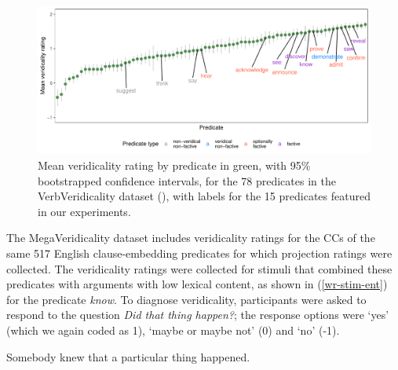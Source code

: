 \documentclass[11pt,fleqn]{article}
\newcommand{\6}{\mbox{$[\hspace*{-.6mm}[$}}
\newcommand{\9}{\mbox{$]\hspace*{-.6mm}]$}}
\begin{document}
\begin{figure}[H]
\centering
\includegraphics[width=.77\paperwidth]{../../VerbVeridicality-analysis/graphs/means-entailment-by-predicate}

\caption{Mean veridicality rating by predicate in green, with 95\% bootstrapped confidence intervals, for the 78 predicates in the VerbVeridicality dataset (\citealt{ross-pavlick2019}), with labels for the 15 predicates featured in our experiments.}
\label{f-vv-projectivity}
\end{figure}

The MegaVeridicality dataset includes veridicality ratings for the CCs of the same 517 English clause-embedding predicates for which projection ratings were collected. The veridicality ratings were collected for stimuli that combined these predicates with arguments with low lexical content, as shown in (\ref{wr-stim-ent}) for the predicate {\em know}. To diagnose veridicality, participants were asked to respond to the question {\em Did that thing happen?}; the response options were `yes' (which we again coded as 1), `maybe or maybe not' (0) and `no' (-1).

\begin{exe}
\ex\label{wr-stim-ent} Somebody knew that a particular thing happened.
\end{exe}
\end{document}
